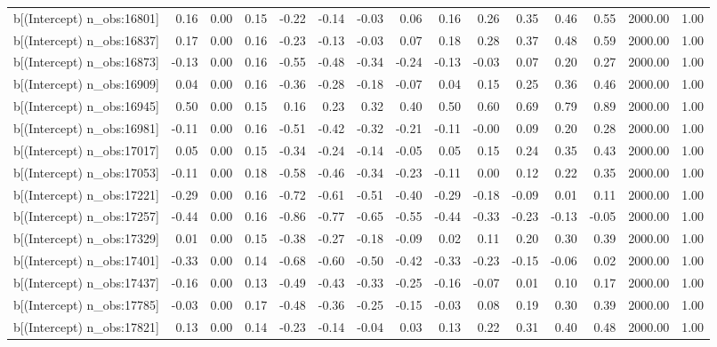 \begin{table}[ht]
\begin{tabular}{rrrrrrrrrrrrrrr}
  b[(Intercept) n\_obs:16801] & 0.16 & 0.00 & 0.15 & -0.22 & -0.14 & -0.03 & 0.06 & 0.16 & 0.26 & 0.35 & 0.46 & 0.55 & 2000.00 & 1.00 \\ 
  b[(Intercept) n\_obs:16837] & 0.17 & 0.00 & 0.16 & -0.23 & -0.13 & -0.03 & 0.07 & 0.18 & 0.28 & 0.37 & 0.48 & 0.59 & 2000.00 & 1.00 \\ 
  b[(Intercept) n\_obs:16873] & -0.13 & 0.00 & 0.16 & -0.55 & -0.48 & -0.34 & -0.24 & -0.13 & -0.03 & 0.07 & 0.20 & 0.27 & 2000.00 & 1.00 \\ 
  b[(Intercept) n\_obs:16909] & 0.04 & 0.00 & 0.16 & -0.36 & -0.28 & -0.18 & -0.07 & 0.04 & 0.15 & 0.25 & 0.36 & 0.46 & 2000.00 & 1.00 \\ 
  b[(Intercept) n\_obs:16945] & 0.50 & 0.00 & 0.15 & 0.16 & 0.23 & 0.32 & 0.40 & 0.50 & 0.60 & 0.69 & 0.79 & 0.89 & 2000.00 & 1.00 \\ 
  b[(Intercept) n\_obs:16981] & -0.11 & 0.00 & 0.16 & -0.51 & -0.42 & -0.32 & -0.21 & -0.11 & -0.00 & 0.09 & 0.20 & 0.28 & 2000.00 & 1.00 \\ 
  b[(Intercept) n\_obs:17017] & 0.05 & 0.00 & 0.15 & -0.34 & -0.24 & -0.14 & -0.05 & 0.05 & 0.15 & 0.24 & 0.35 & 0.43 & 2000.00 & 1.00 \\ 
  b[(Intercept) n\_obs:17053] & -0.11 & 0.00 & 0.18 & -0.58 & -0.46 & -0.34 & -0.23 & -0.11 & 0.00 & 0.12 & 0.22 & 0.35 & 2000.00 & 1.00 \\ 
  b[(Intercept) n\_obs:17221] & -0.29 & 0.00 & 0.16 & -0.72 & -0.61 & -0.51 & -0.40 & -0.29 & -0.18 & -0.09 & 0.01 & 0.11 & 2000.00 & 1.00 \\ 
  b[(Intercept) n\_obs:17257] & -0.44 & 0.00 & 0.16 & -0.86 & -0.77 & -0.65 & -0.55 & -0.44 & -0.33 & -0.23 & -0.13 & -0.05 & 2000.00 & 1.00 \\ 
  b[(Intercept) n\_obs:17329] & 0.01 & 0.00 & 0.15 & -0.38 & -0.27 & -0.18 & -0.09 & 0.02 & 0.11 & 0.20 & 0.30 & 0.39 & 2000.00 & 1.00 \\ 
  b[(Intercept) n\_obs:17401] & -0.33 & 0.00 & 0.14 & -0.68 & -0.60 & -0.50 & -0.42 & -0.33 & -0.23 & -0.15 & -0.06 & 0.02 & 2000.00 & 1.00 \\ 
  b[(Intercept) n\_obs:17437] & -0.16 & 0.00 & 0.13 & -0.49 & -0.43 & -0.33 & -0.25 & -0.16 & -0.07 & 0.01 & 0.10 & 0.17 & 2000.00 & 1.00 \\ 
  b[(Intercept) n\_obs:17785] & -0.03 & 0.00 & 0.17 & -0.48 & -0.36 & -0.25 & -0.15 & -0.03 & 0.08 & 0.19 & 0.30 & 0.39 & 2000.00 & 1.00 \\ 
  b[(Intercept) n\_obs:17821] & 0.13 & 0.00 & 0.14 & -0.23 & -0.14 & -0.04 & 0.03 & 0.13 & 0.22 & 0.31 & 0.40 & 0.48 & 2000.00 & 1.00 \\ 

\end{tabular}
\end{table}
